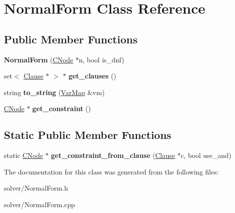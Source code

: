 \hypertarget{classNormalForm}{\section{\-Normal\-Form \-Class \-Reference}
\label{classNormalForm}
}
\subsection*{\-Public \-Member \-Functions}
\begin{DoxyCompactItemize}
\item 
\hypertarget{classNormalForm_aec09071c299bcae2ac856aa546e08a20}{{\bfseries \-Normal\-Form} (\hyperlink{classCNode}{\-C\-Node} $\ast$n, bool is\-\_\-dnf)}\label{classNormalForm_aec09071c299bcae2ac856aa546e08a20}

\item 
\hypertarget{classNormalForm_acc0a30a393e9fb0bb300151e421908ad}{set$<$ \hyperlink{classClause}{\-Clause} $\ast$ $>$ $\ast$ {\bfseries get\-\_\-clauses} ()}\label{classNormalForm_acc0a30a393e9fb0bb300151e421908ad}

\item 
\hypertarget{classNormalForm_af7a02c573646d49b0d9b237f2d816706}{string {\bfseries to\-\_\-string} (\hyperlink{classVarMap}{\-Var\-Map} \&vm)}\label{classNormalForm_af7a02c573646d49b0d9b237f2d816706}

\item 
\hypertarget{classNormalForm_a1aada9f719a46070fd4dbc3ed7c21875}{\hyperlink{classCNode}{\-C\-Node} $\ast$ {\bfseries get\-\_\-constraint} ()}\label{classNormalForm_a1aada9f719a46070fd4dbc3ed7c21875}

\end{DoxyCompactItemize}
\subsection*{\-Static \-Public \-Member \-Functions}
\begin{DoxyCompactItemize}
\item 
\hypertarget{classNormalForm_ac71bf2b54a1fa6959bf8dde54a295996}{static \hyperlink{classCNode}{\-C\-Node} $\ast$ {\bfseries get\-\_\-constraint\-\_\-from\-\_\-clause} (\hyperlink{classClause}{\-Clause} $\ast$c, bool use\-\_\-and)}\label{classNormalForm_ac71bf2b54a1fa6959bf8dde54a295996}

\end{DoxyCompactItemize}


\-The documentation for this class was generated from the following files\-:\begin{DoxyCompactItemize}
\item 
solver/\-Normal\-Form.\-h\item 
solver/\-Normal\-Form.\-cpp\end{DoxyCompactItemize}
